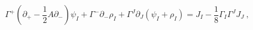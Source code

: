 \begin{equation}
\Gamma^+ ( \partial_+ - \frac{1}{2} A \partial_- ) \psi_I
       + \Gamma^- \partial_- \rho_I
       + \Gamma^J \partial_J (\psi_I + \rho_I)
 = J_I - \frac{1}{8} \Gamma_I \Gamma^J J_J ~,
\end{equation}

